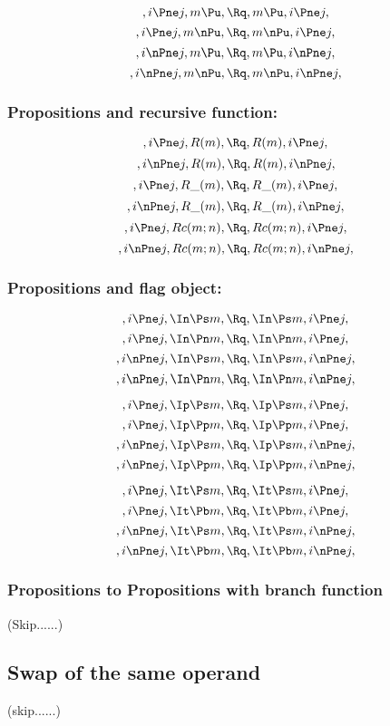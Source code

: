 \[,i \Pne j, m \Pu, \Rq , m \Pu, i \Pne j,\]
\[,i \Pne j, m \nPu, \Rq , m \nPu, i \Pne j,\]
\[,i \nPne j, m \Pu, \Rq , m \Pu, i \nPne j,\]
\[,i \nPne j, m \nPu, \Rq , m \nPu, i \nPne j,\]





\bigskip
\bigskip
\bigskip
\bigskip
\subsubsection{ Propositions and recursive function:}
\[,i \Pne j, R(m), \Rq , R(m), i \Pne j,\]
\[,i \nPne j,R(m), \Rq , R(m), i \nPne j,\]
\[,i \Pne j, R\_(m), \Rq , R\_(m), i \Pne j,\]
\[,i \nPne j, R\_(m), \Rq , R\_(m), i \nPne j,\]
\[,i \Pne j, Rc(m;n), \Rq , Rc(m;n), i \Pne j,\]
\[,i \nPne j,Rc(m;n), \Rq , Rc(m;n), i \nPne j,\]





\bigskip
\bigskip
\bigskip
\bigskip
\subsubsection{ Propositions and flag object:}
\[,i \Pne j, \In \Ps m, \Rq , \In \Ps m, i \Pne j,\]
\[,i \Pne j, \In \Pn m, \Rq , \In \Pn m, i \Pne j,\]
\[,i \nPne j,\In \Ps m, \Rq , \In \Ps m, i \nPne j,\]
\[,i \nPne j, \In \Pn m, \Rq , \In \Pn m, i \nPne j,\]

\[,i \Pne j, \Ip \Ps m, \Rq , \Ip \Ps m, i \Pne j,\]
\[,i \Pne j, \Ip \Pp m, \Rq , \Ip \Pp m, i \Pne j,\]
\[,i \nPne j,\Ip \Ps m, \Rq , \Ip \Ps m, i \nPne j,\]
\[,i \nPne j, \Ip \Pp m, \Rq , \Ip \Pp m, i \nPne j,\]

\[,i \Pne j, \It \Ps m, \Rq , \It \Ps m, i \Pne j,\]
\[,i \Pne j, \It \Pb m, \Rq , \It \Pb m, i \Pne j,\]
\[,i \nPne j,\It \Ps m, \Rq , \It \Ps m, i \nPne j,\]
\[,i \nPne j, \It \Pb m, \Rq , \It \Pb m, i \nPne j,\]







\bigskip
\bigskip
\bigskip
\bigskip
\subsubsection{ Propositions to Propositions with branch function}
(Skip......)





\bigskip
\bigskip
\bigskip
\bigskip
\subsection{ Swap  of the same operand}
(skip......)







